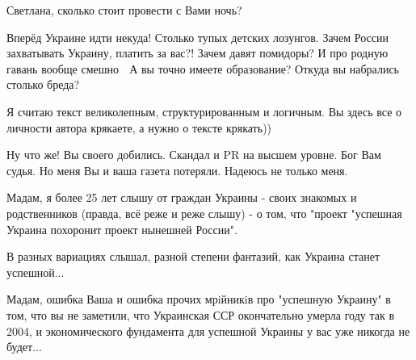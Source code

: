 \begin{itemize}
Светлана, сколько стоит провести с Вами ночь?

 

\obeycr
Вперёд Украине идти некуда! Столько тупых детских лозунгов.
Зачем России захватывать Украину, платить за вас?!
Зачем давят помидоры? И про родную гавань вообще смешно 🤣
А вы точно имеете образование? Откуда вы набрались столько бреда?
\restorecr


 

Я считаю текст великолепным, структурированным и логичным. Вы здесь все о
личности автора крякаете, а нужно о тексте крякать))

 

Ну что же! Вы своего добились. Скандал и PR на высшем уровне. Бог Вам судья. Но
меня Вы и ваша газета потеряли. Надеюсь не только меня.


 

Мадам, я более 25 лет слышу от граждан Украины - своих знакомых и родственников
(правда, всё реже и реже слышу) - о том, что "проект "успешная Украина
похоронит проект нынешней России".

В разных вариациях слышал, разной степени фантазий, как Украина станет
успешной...

Мадам, ошибка Ваша и ошибка прочих мрiйникiв про "успешную Украину" в том, что
вы не заметили, что Украинская ССР окончательно умерла году так в 2004, и
экономического фундамента для успешной Украины у вас уже никогда не будет...


 

\end{itemize}
